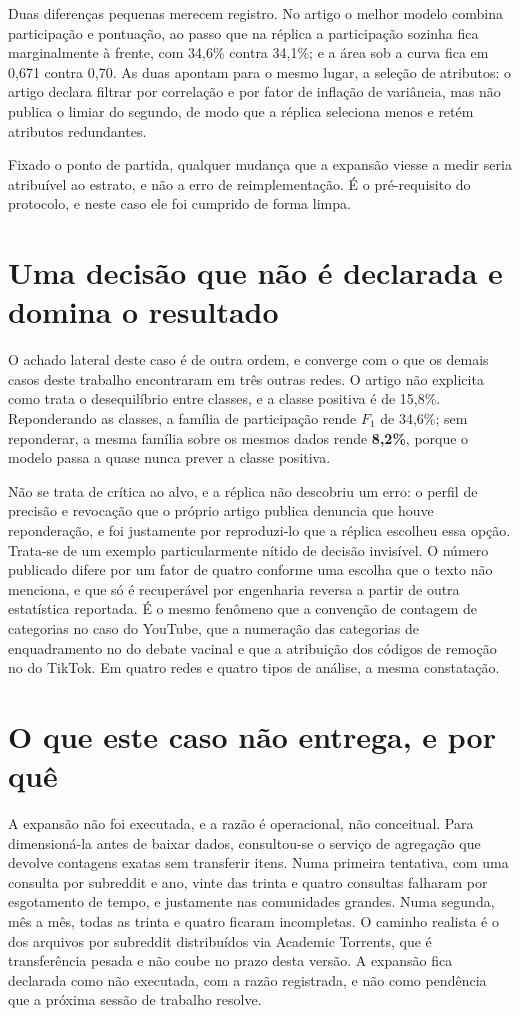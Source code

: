 Duas diferenças pequenas merecem registro. No artigo o melhor modelo combina participação
e pontuação, ao passo que na réplica a participação sozinha fica marginalmente à frente,
com 34,6\% contra 34,1\%; e a área sob a curva fica em 0,671 contra 0,70. As duas
apontam para o mesmo lugar, a seleção de atributos: o artigo declara filtrar por
correlação e por fator de inflação de variância, mas não publica o limiar do segundo, de
modo que a réplica seleciona menos e retém atributos redundantes.

Fixado o ponto de partida, qualquer mudança que a expansão viesse a medir seria
atribuível ao estrato, e não a erro de reimplementação. É o pré-requisito do protocolo,
e neste caso ele foi cumprido de forma limpa.

\section{Uma decisão que não é declarada e domina o resultado}

O achado lateral deste caso é de outra ordem, e converge com o que os demais casos
deste trabalho encontraram em três outras redes. O artigo não explicita como trata o
desequilíbrio entre classes, e a classe positiva é de 15,8\%. Reponderando as classes,
a família de participação rende $F_1$ de 34,6\%; sem reponderar, a mesma família sobre
os mesmos dados rende \textbf{8,2\%}, porque o modelo passa a quase nunca prever a
classe positiva.

Não se trata de crítica ao alvo, e a réplica não descobriu um erro: o perfil de precisão
e revocação que o próprio artigo publica denuncia que houve reponderação, e foi
justamente por reproduzi-lo que a réplica escolheu essa opção. Trata-se de um exemplo
particularmente nítido de decisão invisível. O número publicado difere por um fator de
quatro conforme uma escolha que o texto não menciona, e que só é recuperável por
engenharia reversa a partir de outra estatística reportada. É o mesmo fenômeno que a
convenção de contagem de categorias no caso do YouTube, que a numeração das
categorias de enquadramento no do debate vacinal e que a atribuição dos códigos de
remoção no do TikTok. Em quatro redes e quatro tipos de análise, a mesma
constatação.

\section{O que este caso não entrega, e por quê}

A expansão não foi executada, e a razão é operacional, não conceitual. Para dimensioná-la
antes de baixar dados, consultou-se o serviço de agregação que devolve contagens exatas
sem transferir itens. Numa primeira tentativa, com uma consulta por subreddit e ano,
vinte das trinta e quatro consultas falharam por esgotamento de tempo, e justamente nas
comunidades grandes. Numa segunda, mês a mês, todas as trinta e quatro ficaram
incompletas. O caminho realista é o dos arquivos por subreddit distribuídos via
Academic Torrents, que é transferência pesada e não coube no prazo desta versão. A
expansão fica declarada como não executada, com a razão registrada, e não como pendência
que a próxima sessão de trabalho resolve.

